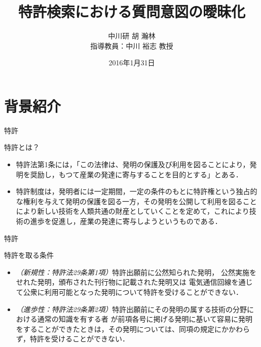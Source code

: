 \documentclass[14pt,xcolor=dvipsnames,table,dvipdfmx]{beamer}
\title{\bfseries 特許検索における質問意図の曖昧化}
\date{2016年1月31日}
\author{中川研 胡 瀚林 \\ 指導教員：中川 裕志 教授}
\begin{document}
\maketitle
\frame{\tableofcontents[hideallsubsections]}


\section{背景紹介}
\begin{frame}{特許}
	\begin{block}{特許とは？}
		\begin{itemize}
        \item 特許法第1条には，「この法律は、発明の保護及び利用を図ることにより，発明を奨励し，もつて産業の発達に寄与することを目的とする」とある．
		\item 特許制度は，発明者には一定期間，一定の条件のもとに特許権という独占的な権利を与えて発明の保護を図る一方，その発明を公開して利用を図ることにより新しい技術を人類共通の財産としていくことを定めて，これにより技術の進歩を促進し，産業の発達に寄与しようというものである．
		\end{itemize}
	\end{block}
\end{frame}

\begin{frame}{特許}
	\begin{block}{特許を取る条件}
		\begin{itemize}
			\item {\em （新規性：特許法29条第1項）}特許出願前に公然知られた発明，
			公然実施をせれた発明，頒布された刊行物に記載された発明又は
			電気通信回線を通じて公衆に利用可能となった発明について特許を受けることができない．
 			\item {\em （進歩性：特許法29条第2項）}特許出願前にその発明の属する技術の分野における通常の知識を有する者
			が前項各号に掲げる発明に基いて容易に発明をすることができたときは，その発明については、同項の規定にかかわらず，特許を受けることができない．
		\end{itemize}
	\end{block}
\end{frame}
\end{document}

